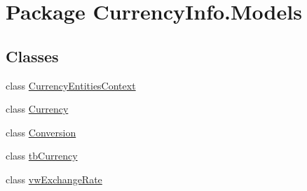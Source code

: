 \hypertarget{namespace_currency_info_1_1_models}{\section{Package Currency\-Info.\-Models}
\label{namespace_currency_info_1_1_models}
}
\subsection*{Classes}
\begin{DoxyCompactItemize}
\item 
class \hyperlink{class_currency_info_1_1_models_1_1_currency_entities_context}{Currency\-Entities\-Context}
\item 
class \hyperlink{class_currency_info_1_1_models_1_1_currency}{Currency}
\item 
class \hyperlink{class_currency_info_1_1_models_1_1_conversion}{Conversion}
\item 
class \hyperlink{class_currency_info_1_1_models_1_1tb_currency}{tb\-Currency}
\item 
class \hyperlink{class_currency_info_1_1_models_1_1vw_exchange_rate}{vw\-Exchange\-Rate}
\end{DoxyCompactItemize}
